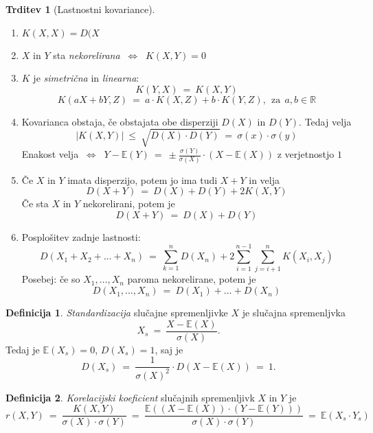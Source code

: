 \documentclass[11pt]{article}
\theoremstyle{definition}
\newtheorem{definicija}{Definicija}[section]
\theoremstyle{definition}
\newtheorem{trditev}{Trditev}[section]
\theoremstyle{definition}
\begin{document}
\begin{trditev}[Lastnostni kovariance]
~\\
\begin{enumerate}
	\item $K(X,X) = D(X$
	\item $X$ in $Y$ sta \textit{nekorelirana} $~\Leftrightarrow~$ $K(X, Y) = 0$
	\item $K$ je \textit{simetrična} in \textit{linearna}:
	$$K(Y, X) ~=~ K(X, Y)$$
	$$K(aX + bY, Z) ~=~ a \cdot K(X, Z) + b \cdot K(Y, Z), ~~\text{za}~~ a, b \in \mathbb{R}$$
	\item Kovarianca obstaja, če obstajata obe disperziji $D(X)$ in $D(Y)$. Tedaj velja
	$$|K(X,Y)| ~\leq~ \sqrt{D(X) \cdot D(Y)} ~=~ \sigma(x) \cdot \sigma(y)$$
	Enakost velja $~\Leftrightarrow~$ $Y - \mathbb{E}(Y) ~=~ \pm \frac{\sigma(Y)}{\sigma(X)} \cdot (X - \mathbb{E}(X))$ z verjetnostjo $1$
	\item Če $X$ in $Y$ imata disperzijo, potem jo ima tudi $X+Y$ in velja
	$$D(X+Y) ~=~ D(X) + D(Y) + 2K(X,Y)$$
	Če sta $X$ in $Y$ nekorelirani, potem je
	$$D(X+Y) ~=~ D(X) + D(Y)$$
	\item Posplošitev  zadnje lastnosti:
	$$D(X_1 + X_2 + \ldots + X_n) ~=~ \sum_{k=1}^n D(X_n) + 2\sum_{i=1}^{n-1} \sum_{j=i+1}^n K(X_i, X_j)$$
	Posebej: če so $X_1, \ldots, X_n$ paroma nekorelirane, potem je 
	$$D(X_1, \ldots, X_n) ~=~ D(X_1) + \ldots + D(X_n)$$
\end{enumerate}
\end{trditev}
\vspace{0.5cm}

\begin{definicija}

\textit{Standardizacija} slučajne spremenljivke $X$ je slučajna spremenljvka
$$X_s ~=~ \frac{X - \mathbb{E}(X)}{\sigma(X)}.$$
Tedaj je $\mathbb{E}(X_s) = 0$, $D(X_s) = 1$, saj je
$$D(X_s) ~=~ \frac{1}{\sigma(X)^2} \cdot D(X - \mathbb{E}(X)) ~=~ 1.$$

\end{definicija}
\vspace{0.5cm}

\begin{definicija}

\textit{Korelacijski koeficient} slučajnih spremenljivk $X$ in $Y$ je
$$r(X,Y) ~=~ \frac{K(X, Y)}{\sigma(X) \cdot \sigma(Y)} ~=~ \frac{\mathbb{E}((X - \mathbb{E}(X)) \cdot (Y - \mathbb{E}(Y)))}{\sigma(X) \cdot \sigma(Y)} ~=~ \mathbb{E}(X_s \cdot Y_s)$$

\end{definicija}
\vspace{0.5cm}
\end{document}
